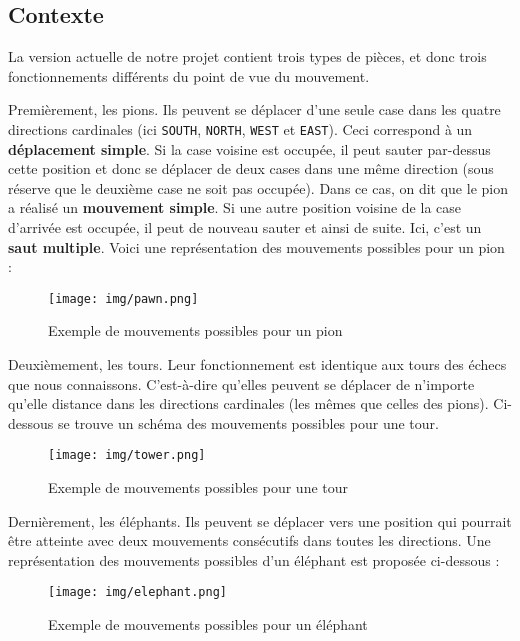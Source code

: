 \documentclass[a4paper]{article}
\begin{document}
\subsection{Contexte}
\label{contxt}
La version actuelle de notre projet contient trois types de pièces, et donc trois fonctionnements différents du point de vue du mouvement.

Premièrement, les pions. Ils peuvent se déplacer d'une seule case dans les quatre directions cardinales (ici \verb|SOUTH|, \verb|NORTH|, \verb|WEST| et \verb|EAST|). Ceci correspond à un \textbf{déplacement simple}. Si la case voisine est occupée, il peut sauter par-dessus cette position et donc se déplacer de deux cases dans une même direction (sous réserve que le deuxième case ne soit pas occupée). Dans ce cas, on dit que le pion a réalisé un \textbf{mouvement simple}. Si une autre position voisine de la case d'arrivée est occupée, il peut de nouveau sauter et ainsi de suite. Ici, c'est un \textbf{saut multiple}. Voici une représentation des mouvements possibles pour un pion :

\begin{figure}[H]
  \centering
  \texttt{[image: img/pawn.png]}
  \caption{Exemple de mouvements possibles pour un pion}
  \label{fig:pawn}
\end{figure}

Deuxièmement, les tours. Leur fonctionnement est identique aux tours des échecs que nous connaissons. C'est-à-dire qu'elles peuvent se déplacer de n'importe qu'elle distance dans les directions cardinales (les mêmes que celles des pions). Ci-dessous se trouve un schéma des mouvements possibles pour une tour.

\begin{figure}[H]
  \centering
  \texttt{[image: img/tower.png]}
  \caption{Exemple de mouvements possibles pour une tour}
  \label{fig:tower}
\end{figure}

Dernièrement, les éléphants. Ils peuvent se déplacer vers une position qui pourrait être atteinte avec deux mouvements consécutifs dans toutes les directions. Une représentation des mouvements possibles d'un éléphant est proposée ci-dessous :

\begin{figure}[H]
  \centering
  \texttt{[image: img/elephant.png]}
  \caption{Exemple de mouvements possibles pour un éléphant}
  \label{fig:elephant}
\end{figure}
\end{document}
